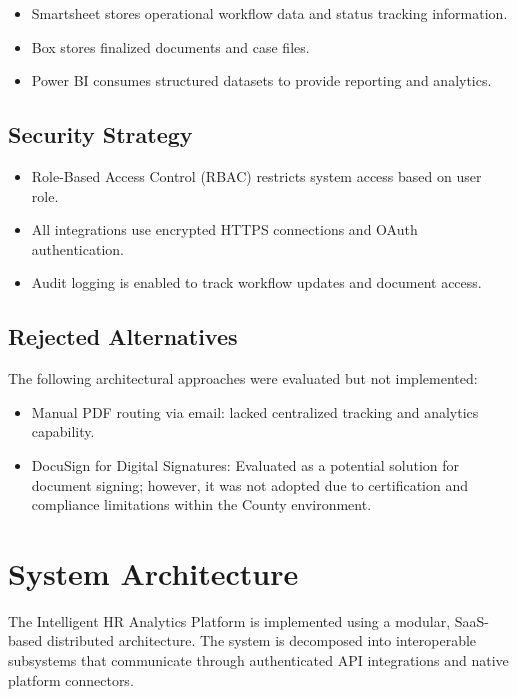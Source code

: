 \documentclass[12pt]{article}
\begin{document}
\begin{itemize}
    \item Smartsheet stores operational workflow data and status tracking information.
    \item Box stores finalized documents and case files.
    \item Power BI consumes structured datasets to provide reporting and analytics.
\end{itemize}

\subsection{Security Strategy}

\begin{itemize}
    \item Role-Based Access Control (RBAC) restricts system access based on user role.
    \item All integrations use encrypted HTTPS connections and OAuth authentication.
    \item Audit logging is enabled to track workflow updates and document access.
\end{itemize}

\subsection{Rejected Alternatives}
The following architectural approaches were evaluated but not implemented:

\begin{itemize}
    \item Manual PDF routing via email: lacked centralized tracking and analytics capability.
    \item DocuSign for Digital Signatures: Evaluated as a potential solution for document signing; however, it was not adopted due to certification and compliance limitations within the County environment.
\end{itemize}


\section{System Architecture}

The Intelligent HR Analytics Platform is implemented using a modular, SaaS-based distributed architecture. The system is decomposed into interoperable subsystems that communicate through authenticated API integrations and native platform connectors.
\end{document}
